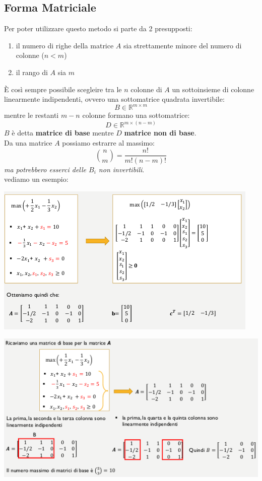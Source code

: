 \message{ !name(ro.tex)}\documentclass[a4paper,12pt, oneside]{book}
\begin{document}
\subsection{Forma Matriciale}
Per poter utilizzare questo metodo si parte da 2 presupposti:
\begin{enumerate}
  \item il numero di righe della matrice $A$ sia strettamente
  minore del numero di colonne ($n<m$)
  \item il rango di $A$ sia $m$
\end{enumerate}
È così sempre possibile scegleire tra le $n$ colonne di $A$ un
sottoinsieme di colonne linearmente indipendenti, ovvero una
sottomatrice quadrata invertibile:
\[B\in\mathbb{R}^{m\times m}\]
mentre le restanti $m-n$ colonne formano una sottomatrice:
\[D\in\mathbb{R}^{m\times (n-m)}\]
$B$ è detta \textbf{matrice di base} mentre $D$ \textbf{matrice non di
  base}.\\
Da una matrice $A$ possiamo estrarre al massimo:
\[{n\choose m}=\frac{n!}{m!(n-m)!}\]
\textit{ma potrebbero esserci delle $B_i$ non invertibili}.\\
vediamo un esempio:
\begin{center}
  \includegraphics[scale = 1]{img/matr.png}
\end{center}
\begin{center}
  \includegraphics[scale = 1]{img/matr2.png}
\end{center}
\end{document}
